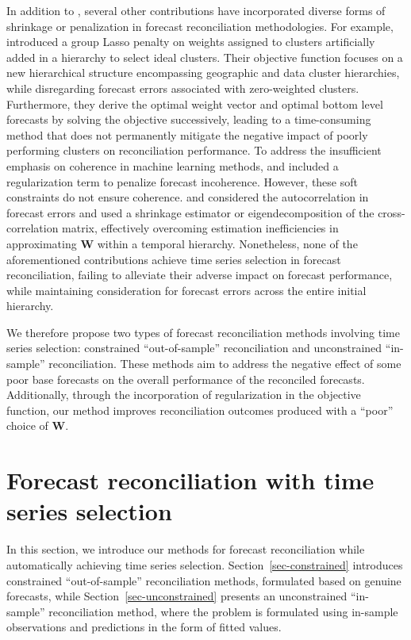 \documentclass[
  11pt]{article}
\theoremstyle{plain}
\theoremstyle{remark}
\begin{document}
In addition to \citet{Ben_Taieb2019-be}, several other contributions
have incorporated diverse forms of shrinkage or penalization in forecast
reconciliation methodologies. For example, \citet{Pang2022-hi}
introduced a group Lasso penalty on weights assigned to clusters
artificially added in a hierarchy to select ideal clusters. Their
objective function focuses on a new hierarchical structure encompassing
geographic and data cluster hierarchies, while disregarding forecast
errors associated with zero-weighted clusters. Furthermore, they derive
the optimal weight vector and optimal bottom level forecasts by solving
the objective successively, leading to a time-consuming method that does
not permanently mitigate the negative impact of poorly performing
clusters on reconciliation performance. To address the insufficient
emphasis on coherence in machine learning methods,
\citet{Mishchenko2019-as} and \citet{Gleason2020-fo} included a
regularization term to penalize forecast incoherence. However, these
soft constraints do not ensure coherence. \citet{Nystrup2020-te} and
\citet{Nystrup2021-di} considered the autocorrelation in forecast errors
and used a shrinkage estimator or eigendecomposition of the
cross-correlation matrix, effectively overcoming estimation
inefficiencies in approximating \(\bm{W}\) within a temporal hierarchy.
Nonetheless, none of the aforementioned contributions achieve time
series selection in forecast reconciliation, failing to alleviate their
adverse impact on forecast performance, while maintaining consideration
for forecast errors across the entire initial hierarchy.

We therefore propose two types of forecast reconciliation methods
involving time series selection: constrained ``out-of-sample''
reconciliation and unconstrained ``in-sample'' reconciliation. These
methods aim to address the negative effect of some poor base forecasts
on the overall performance of the reconciled forecasts. Additionally,
through the incorporation of regularization in the objective function,
our method improves reconciliation outcomes produced with a ``poor''
choice of \(\bm{W}\).

\section{Forecast reconciliation with time series
selection}\label{sec-methodology}

In this section, we introduce our methods for forecast reconciliation
while automatically achieving time series selection.
Section~\ref{sec-constrained} introduces constrained ``out-of-sample''
reconciliation methods, formulated based on genuine forecasts, while
Section~\ref{sec-unconstrained} presents an unconstrained ``in-sample''
reconciliation method, where the problem is formulated using in-sample
observations and predictions in the form of fitted values.
\end{document}

